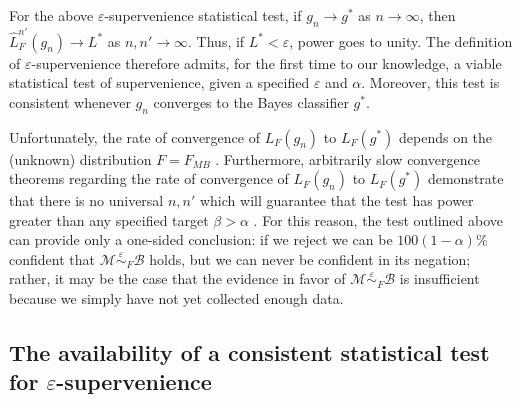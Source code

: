 \documentclass{article}
\newcommand{\conv}{\rightarrow}
\newcommand{\mB}{\mathcal{B}}
\newcommand{\mM}{\mathcal{M}}
\newcommand{\eps}{\varepsilon}
\providecommand{\mh}[1]{\widehat{#1}}
\newcommand{\hL}{\widehat{L}}
\newcommand{\MeB}{\mM \overset{\varepsilon}{{\sim}}_{F} \mB}
\providecommand{\tr}[1]{\textcolor{black}{#1}}
\begin{document}
 For the above $\eps$-supervenience statistical test, if $g_n \conv g^*$ as $n \conv \infty$, then $\hL^{n'}_F(g_n) \conv L^*$ as $n,n' \conv \infty$.  Thus, if $L^* < \eps$, 
power goes to unity.
The definition of $\eps$-supervenience therefore admits, for the first time to our knowledge, a viable statistical test of supervenience, given a specified $\eps$ and $\alpha$. Moreover, this test is consistent whenever $g_n$ converges to the Bayes classifier $g^*$.


Unfortunately, the rate of convergence of $L_{F}(g_n)$ to $L_{F}(g^*)$ depends on the (unknown) distribution $F=F_{MB}$ \cite{DGL96}. Furthermore, arbitrarily slow convergence theorems regarding the rate of convergence of $L_{F}(g_n)$ to $L_{F}(g^*)$ demonstrate that there is no universal $n,n'$ which will guarantee that the test has power greater than any specified target $\beta > \alpha$ \cite{Devroye83}. For this reason, the test outlined above can provide only a one-sided conclusion: if we reject we can be $100(1-\alpha)$\% confident that $\MeB$ holds, but we can never be confident in its negation; rather, it may be the case that the evidence in favor of $\MeB$ is insufficient 
because we simply have not yet collected enough data. 



\subsection*{The availability of a consistent statistical test for $\eps$-supervenience} %
\label{sub:uc}
\end{document}

